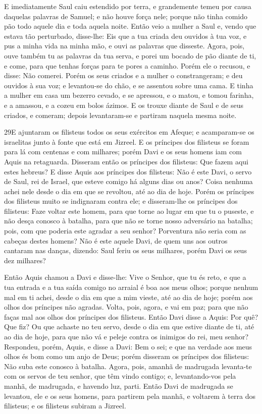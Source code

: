 E imediatamente Saul caiu estendido por terra, e grandemente
temeu por causa daquelas palavras de Samuel; e não houve força nele;
porque não tinha comido pão todo aquele dia e toda aquela noite.
Então veio a mulher a Saul e, vendo que estava tão
perturbado, disse-lhe: Eis que a tua criada deu ouvidos à tua voz, e
pus a minha vida na minha mão, e ouvi as palavras que disseste.
Agora, pois, ouve também tu as palavras da tua serva, e porei
um bocado de pão diante de ti, e come, para que tenhas forças para
te pores a caminho. Porém ele o recusou, e disse: Não
comerei. Porém os seus criados e a mulher o constrangeram; e deu
ouvidos à sua voz; e levantou-se do chão, e se assentou sobre uma
cama. E tinha a mulher em casa um bezerro cevado, e se
apressou, e o matou, e tomou farinha, e a amassou, e a cozeu em
bolos ázimos. E os trouxe diante de Saul e de seus criados, e
comeram; depois levantaram-se e partiram naquela mesma noite.

\medskip

\lettrine{29} E ajuntaram os filisteus todos os seus exércitos
em Afeque; e acamparam-se os israelitas junto à fonte que está em
Jizreel. E os príncipes dos filisteus se foram para lá com
centenas e com milhares; porém Davi e os seus homens iam com Aquis
na retaguarda. Disseram então os príncipes dos filisteus: Que
fazem aqui estes hebreus? E disse Aquis aos príncipes dos filisteus:
Não é este Davi, o servo de Saul, rei de Israel, que esteve comigo
há alguns dias ou anos? Coisa nenhuma achei nele desde o dia em que
se revoltou, até ao dia de hoje. Porém os príncipes dos
filisteus muito se indignaram contra ele; e disseram-lhe os
príncipes dos filisteus: Faze voltar este homem, para que torne ao
lugar em que tu o puseste, e não desça conosco à batalha, para que
não se torne nosso adversário na batalha; pois, com que poderia este
agradar a seu senhor? Porventura não seria com as cabeças destes
homens? Não é este aquele Davi, de quem uns aos outros cantaram
nas danças, dizendo: Saul feriu os seus milhares, porém Davi os seus
dez milhares?

Então Aquis chamou a Davi e disse-lhe: Vive o Senhor, que tu és
reto, e que a tua entrada e a tua saída comigo no arraial é boa aos
meus olhos; porque nenhum mal em ti achei, desde o dia em que a mim
vieste, até ao dia de hoje; porém aos olhos dos príncipes não
agradas. Volta, pois, agora, e vai em paz; para que não faças
mal aos olhos dos príncipes dos filisteus. Então Davi disse a
Aquis: Por quê? Que fiz? Ou que achaste no teu servo, desde o dia em
que estive diante de ti, até ao dia de hoje, para que não vá e
peleje contra os inimigos do rei, meu senhor? Respondeu, porém,
Aquis, e disse a Davi: Bem o sei; e que na verdade aos meus olhos és
bom como um anjo de Deus; porém disseram os príncipes dos filisteus:
Não suba este conosco à batalha. Agora, pois, amanhã de
madrugada levanta-te com os servos de teu senhor, que têm vindo
contigo; e, levantando-vos pela manhã, de madrugada, e havendo luz,
parti. Então Davi de madrugada se levantou, ele e os seus
homens, para partirem pela manhã, e voltarem à terra dos filisteus;
e os filisteus subiram a Jizreel.

